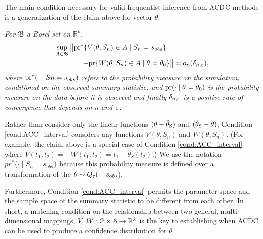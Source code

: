 
	
The main condition necessary for valid frequentist inference from ACDC methods is a generalization of the claim above for vector $\theta$. 
	\begin{condition} \label{cond:ACC_interval}
		{\it For $\mathfrak{B}$ a Borel set on $\mathbb{R}^k$,  
		\begin{eqnarray*}
	 \sup_{A\in\mathfrak{B}}\big\| \text{\rm pr}^*\{V(\theta, S_n) \in A \mid  {S_n = s_{\rm obs}} \} \quad\quad\qquad\qquad & \\
		  - \text{\rm pr}\{W( \theta, S_n) \in A \mid {\theta = \theta_0} \}
		\big\| = o_p(\delta_{n,\veps}), &
		\end{eqnarray*} 
		where $\text{\rm pr}^*(\cdot \mid Sn =  s_{\rm obs}) $ refers to the probability measure on the simulation, conditional on the observed summary statistic, and $\text{\rm pr}(\cdot \mid \theta = \theta_{0})$ is the probability measure on the data before it is observed and finally $\delta_{n,\veps}$ is a positive rate of convergence that depends on $n$ and $\veps$. }
	\end{condition}
Rather than consider only the linear functions $(\theta-\htheta)$ and $(\htheta-\theta)$, Condition \ref{cond:ACC_interval} considers any functions $V(\theta, S_n)$ and $W( \theta, S_n)$. (For example, the claim above is a special case of Condition \ref{cond:ACC_interval} where $V(t_1, t_2) = - W(t_1, t_2) = t_1 -\hat{\theta}_{S}(t_2)$.) We use the notation $pr^*\{\cdot \mid S_n = s_{obs}\}$  because this probability measure is defined over a transformation of the $\theta \sim Q_{\veps}(\cdot \mid s_{obs}$).  

Furthermore, Condition \ref{cond:ACC_interval} permits the parameter space and the sample space of the summary statistic to be different from each other. In short, a matching condition on the relationship between two general, multi-dimensional mappings, $V$, $W: \P \times {\cal S}  \rightarrow \mathbb{R}^k$ is the key to establishing when ACDC can be used to produce a confidence distribution for $\theta$.
	

